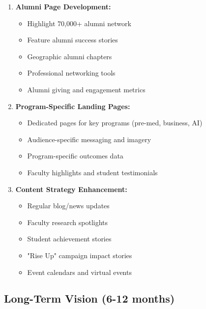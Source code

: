 \documentclass[12pt,letterpaper]{article}
\begin{document}
\begin{enumerate}[leftmargin=*]
    \item \textbf{Alumni Page Development:}
    \begin{itemize}
        \item Highlight 70,000+ alumni network
        \item Feature alumni success stories
        \item Geographic alumni chapters
        \item Professional networking tools
        \item Alumni giving and engagement metrics
    \end{itemize}

    \item \textbf{Program-Specific Landing Pages:}
    \begin{itemize}
        \item Dedicated pages for key programs (pre-med, business, AI)
        \item Audience-specific messaging and imagery
        \item Program-specific outcomes data
        \item Faculty highlights and student testimonials
    \end{itemize}

    \item \textbf{Content Strategy Enhancement:}
    \begin{itemize}
        \item Regular blog/news updates
        \item Faculty research spotlights
        \item Student achievement stories
        \item "Rise Up" campaign impact stories
        \item Event calendars and virtual events
    \end{itemize}
\end{enumerate}

\subsection{Long-Term Vision (6-12 months)}
\end{document}
